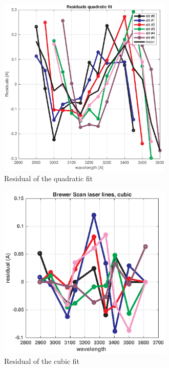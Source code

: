 \documentclass[acp]{copernicus} %
\begin{document}
\begin{figure}[t]
\includegraphics[width=8.3cm]{figures/General_DSP_QUAD_RES.eps}
\caption{ Residual of the quadratic fit}
\label{fig:dsp_residual_quad}
\end{figure}


\begin{figure}[t]
\includegraphics[width=8.3cm]{figures/General_brewer_scan_cubic_residual.eps}
\caption{ Residual of the cubic fit}
\label{fig:dsp_residual_cubic}
\end{figure}

\end{document}

